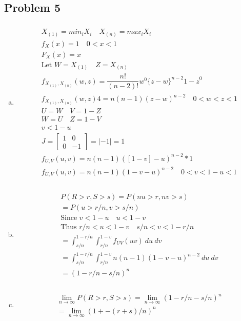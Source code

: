 \documentclass{article}
\begin{document}
\begin{flushleft}
	\section*{Problem 5}
	
\begin{enumerate}[(a)]
	\item 
\begin{multline*}\\
X_{(1)}=min_iX_i \quad X_{(n)}=max_iX_i\\
f_X(x)=1 \quad 0<x<1\\
F_X(x)=x\\
\text{Let } W=X_{(1)} \quad Z=X_{(n)}\\
f_{X_{(1)},X_{(n)}}(w,z)=\dfrac{n!}{(n-2)!}w^{0}\{z-w\}^{n-2}{1-z}^{0}\\
f_{X_{(1)},X_{(n)}}(w,z)4=n(n-1)(z-w)^{n-2} \quad 0<w<z<1\\
U=W \quad V=1-Z\\
W=U \quad Z=1-V\\
v<1-u\\
J=\begin{bmatrix}
1&0\\
0&-1
\end{bmatrix}=|-1|=1\\
f_{U,V}(u,v)=n(n-1)([1-v]-u)^{n-2}*1\\
f_{U,V}(u,v)=n(n-1)(1-v-u)^{n-2} \quad 0<v<1-u<1\\
\end{multline*}
	\item 
\begin{multline*}\\
P(R>r,S>s)=P(nu>r,nv>s)\\
=P(u>r/n,v>s/n)\\
\text{Since } v<1-u \quad u<1-v\\
\text{Thus } r/n<u<1-v \quad s/n<v<1-r/n\\
=\int_{s/n}^{1-r/n}\int_{r/n}^{1-v}f_{UV}(uv)\ du \ dv\\
=\int_{s/n}^{1-r/n}\int_{r/n}^{1-v}n(n-1)(1-v-u)^{n-2}\ du \ dv\\
=\left(1-r/n-s/n\right)^n\\
\end{multline*}
	\item 
\begin{multline*}\\
\lim_{n\to \infty}P(R>r,S>s)=\lim_{n\to \infty}\left( 1-r/n-s/n\right)^n\\
=\lim_{n\to \infty}\left( 1+-(r+s)/n\right)^n\\

\end{multline*}
\end{enumerate}
\end{flushleft}
\end{document}
